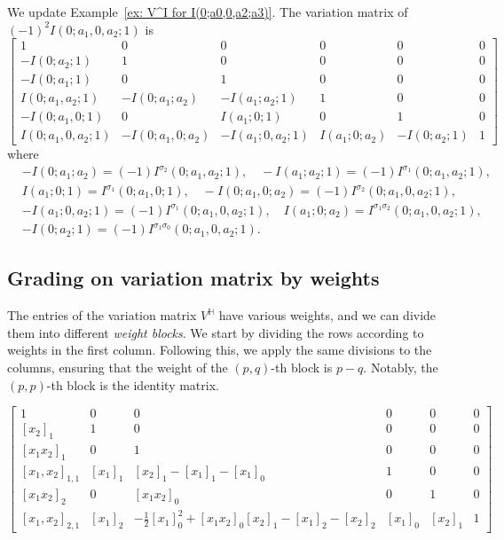 \begin{example}
We update Example~\ref{ex: V^I for I(0;a0,0,a2;a3)}. The variation matrix of $(-1)^2I(0;a_1,0,a_2;1)$ is
\begin{equation}
\begin{bmatrix}
1&0&0&0&0&0\\
-I(0;a_2;1)&1&0&0&0&0\\
-I(0;a_1;1)&0&1&0&0&0\\
I(0;a_1,a_2;1)&-I(0;a_1;a_2)&-I(a_1;a_2;1)&1&0&0\\
-I(0;a_1,0;1)&0&I(a_1;0;1)&0&1&0\\
I(0;a_1,0,a_2;1)&-I(0;a_1,0;a_2)&-I(a_1;0,a_2;1)&I(a_1;0;a_2)&-I(0;a_2;1)&1
\end{bmatrix}
\end{equation}
where
\begin{align*}
&-I(0;a_1;a_2)=(-1)I^{\sigma_2}(0;a_1,a_2;1),\quad-I(a_1;a_2;1)=(-1)I^{\sigma_1}(0;a_1,a_2;1),\\
&I(a_1;0;1)=I^{\sigma_1}(0;a_1,0;1),\quad-I(0;a_1,0;a_2)=(-1)I^{\sigma_2}(0;a_1,0,a_2;1),\\
&-I(a_1;0,a_2;1)=(-1)I^{\sigma_1}(0;a_1,0,a_2;1),\quad I(a_1;0;a_2)=I^{\sigma_1\sigma_2}(0;a_1,0,a_2;1),\\
&-I(0;a_2;1)=(-1)I^{\sigma_1\sigma_0}(0;a_1,0,a_2;1).
\end{align*}
\end{example}

\subsection{Grading on variation matrix by weights}

The entries of the variation matrix $V^{\mathbb H}$ have various weights, and we can divide them into different \textit{weight blocks}. We start by dividing the rows according to weights in the first column. Following this, we apply the same divisions to the columns, ensuring that the weight of the $(p,q)$-th block is $p-q$. Notably, the $(p,p)$-th block is the identity matrix.

\begin{example}
\[
\left[
\begin{array}{c|cc|cc|c}
1&0&0&0&0&0\\
\hline
{[x_2]_1}&1&0&0&0&0\\
{[x_1x_2]_1}&0&1&0&0&0\\
\hline
{[x_1,x_2]_{1,1}}&[x_1]_1&[x_2]_1-[x_1]_1-[x_1]_0&1&0&0\\
{[x_1x_2]_2}&0&{[x_1x_2]_0}&0&1&0\\
\hline
{[x_1,x_2]_{2,1}}&[x_1]_2&-\frac{1}{2}[x_1]_0^2+[x_1x_2]_0[x_2]_1-[x_1]_2-[x_2]_2&[x_1]_0&[x_2]_1&1
\end{array}
\right]
\]
\end{example}

